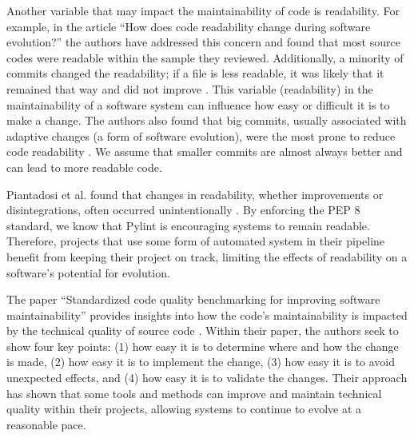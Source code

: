 Another variable that may impact the maintainability of code is readability. For example, in the article ``How does code readability change during software evolution?'' the authors have addressed this concern and found that most source codes were readable within the sample they reviewed. Additionally, a minority of commits changed the readability; if a file is less readable, it was likely that it remained that way and did not improve \cite{piantadosi:2020}. This variable (readability) in the maintainability of a software system can influence how easy or difficult it is to make a change. The authors also found that big commits, usually associated with adaptive changes (a form of software evolution), were the most prone to reduce code readability \cite{piantadosi:2020}. We assume that smaller commits are almost always better and can lead to more readable code.

Piantadosi et al. found that changes in readability, whether improvements or disintegrations, often occurred unintentionally \cite{piantadosi:2020}. By enforcing the PEP 8 standard, we know that Pylint is encouraging systems to remain readable. Therefore, projects that use some form of automated system in their pipeline benefit from keeping their project on track, limiting the effects of readability on a software's potential for evolution.

The paper ``Standardized code quality benchmarking for improving software maintainability'' provides insights into how the code's maintainability is impacted by the technical quality of source code \cite{baggen:2012}. Within their paper, the authors seek to show four key points: (1) how easy it is to determine where and how the change is made, (2) how easy it is to implement the change, (3) how easy it is to avoid unexpected effects, and (4) how easy it is to validate the changes. Their approach has shown that some tools and methods can improve and maintain technical quality within their projects, allowing systems to continue to evolve at a reasonable pace.

